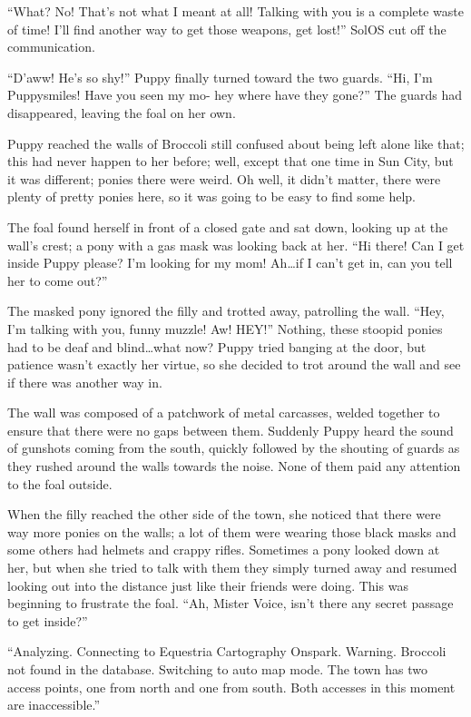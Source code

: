 ``What? No! That's not what I meant at all! Talking with you is a complete waste of time! I'll find another way to get those weapons, get lost!'' SolOS cut off the communication.

``D'aww! He's so shy!'' Puppy finally turned toward the two guards. ``Hi, I'm Puppysmiles! Have you seen my mo- hey where have they gone?'' The guards had disappeared, leaving the foal on her own.

\horizonline


Puppy reached the walls of Broccoli still confused about being left alone like that; this had never happen to her before; well, except that one time in Sun City, but it was different; ponies there were weird. Oh well, it didn't matter, there were plenty of pretty ponies here, so it was going to be easy to find some help.

The foal found herself in front of a closed gate and sat down, looking up at the wall's crest; a pony with a gas mask was looking back at her. ``Hi there! Can I get inside Puppy please? I'm looking for my mom! Ah\dots if I can't get in, can you tell her to come out?''

The masked pony ignored the filly and trotted away, patrolling the wall. ``Hey, I'm talking with you, funny muzzle! Aw! HEY!'' Nothing, these stoopid ponies had to be deaf and blind\dots what now? Puppy tried banging at the door, but patience wasn't exactly her virtue, so she decided to trot around the wall and see if there was another way in.

The wall was composed of a patchwork of metal carcasses, welded together to ensure that there were no gaps between them. Suddenly Puppy heard the sound of gunshots coming from the south, quickly followed by the shouting of guards as they rushed around the walls towards the noise. None of them paid any attention to the foal outside.

When the filly reached the other side of the town, she noticed that there were way more ponies on the walls; a lot of them were wearing those black masks and some others had helmets and crappy rifles. Sometimes a pony looked down at her, but when she tried to talk with them they simply turned away and resumed looking out into the distance just like their friends were doing. This was beginning to frustrate the foal. ``Ah, Mister Voice, isn't there any secret passage to get inside?''

``{\mt Analyzing. Connecting to Equestria Cartography Onspark. Warning. Broccoli not found in the database. Switching to auto map mode. The town has two access points, one from north and one from south. Both accesses in this moment are inaccessible.}''

